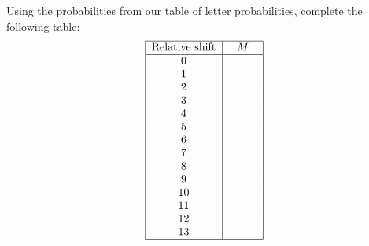 Using the probabilities from our table of letter probabilities,
complete the following table:
\[
\begin{tabular}{|c|c|}
  \hline
  Relative shift &  $M$ \\ \hline
  0 &  \,\,\,\,\,\,\,\,\,\,\,\,\,\,\,\\
  1 &  \\
  2 &  \\
  3 &  \\
  4 &  \\
  5 &  \\
  6 &  \\
  7 &  \\
  8 &  \\
  9 &  \\
  10 &  \\
  11 &  \\
  12 &  \\
  13 &  \\
  \hline
\end{tabular}
\]
